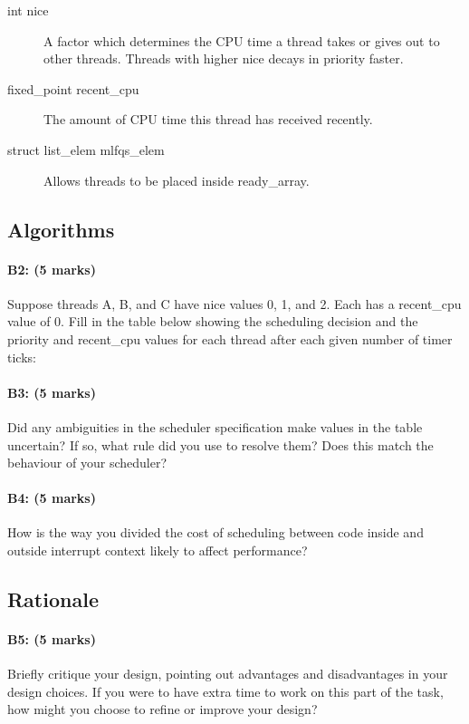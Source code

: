 \begin{description}
  \begin{description}

  \item[int nice] A factor which determines the CPU time a thread takes or gives
    out to other threads. Threads with higher nice decays in priority faster.

  \item[fixed\_point recent\_cpu] The amount of CPU time this thread has received
    recently.

  \item[struct list\_elem mlfqs\_elem] Allows threads to be placed inside
    ready\_array.

  \end{description}

\end{description}

\subsection{Algorithms}
\paragraph{B2: (5 marks)}
Suppose threads A, B, and C have nice values 0, 1, and 2.  Each has a
recent\_cpu value of 0.  Fill in the table below showing the scheduling decision
and the priority and recent\_cpu values for each thread after each given number
of timer ticks:

\paragraph{B3: (5 marks)}
Did any ambiguities in the scheduler specification make values in the table
uncertain?  If so, what rule did you use to resolve them?  Does this match the
behaviour of your scheduler?

\paragraph{B4: (5 marks)}
How is the way you divided the cost of scheduling between code inside and
outside interrupt context likely to affect performance?

\subsection{Rationale}
\paragraph{B5: (5 marks)}
Briefly critique your design, pointing out advantages and disadvantages in your
design choices.  If you were to have extra time to work on this part of the
task, how might you choose to refine or improve your design?

